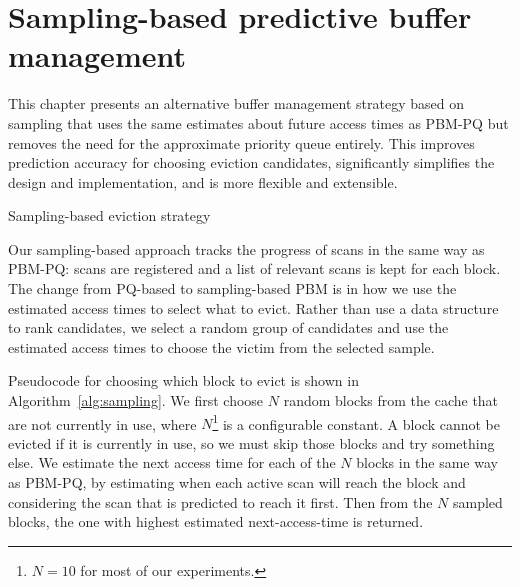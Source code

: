 
\chapter{\label{sec:PBM-sampling}Sampling-based predictive buffer management}
This chapter presents an alternative buffer management strategy based on sampling that uses the same estimates about future access times as PBM-PQ but removes the need for the approximate priority queue entirely. This improves prediction accuracy for choosing eviction candidates, significantly simplifies the design and implementation, and is more flexible and extensible.

\begin{algorithm}
\SetAlgoLined
\DontPrintSemicolon
{}

\;

\;
\caption{Sampling-based eviction strategy}
\label{alg:sampling}
\end{algorithm}

Our sampling-based approach tracks the progress of scans in the same way as PBM-PQ: scans are registered and a list of relevant scans is kept for each block. The change from PQ-based to sampling-based PBM is in how we use the estimated access times to select what to evict. Rather than use a data structure to rank candidates, we select a random group of candidates and use the estimated access times to choose the victim from the selected sample.

Pseudocode for choosing which block to evict is shown in Algorithm~\ref{alg:sampling}. We first choose $N$ random blocks from the cache that are not currently in use, where $N$\footnote{$N=10$ for most of our experiments.} is a configurable constant. A block cannot be evicted if it is currently in use, so we must skip those blocks and try something else. We estimate the next access time for each of the $N$ blocks in the same way as PBM-PQ, by estimating when each active scan will reach the block and considering the scan that is predicted to reach it first. Then from the $N$ sampled blocks, the one with highest estimated next-access-time is returned.

